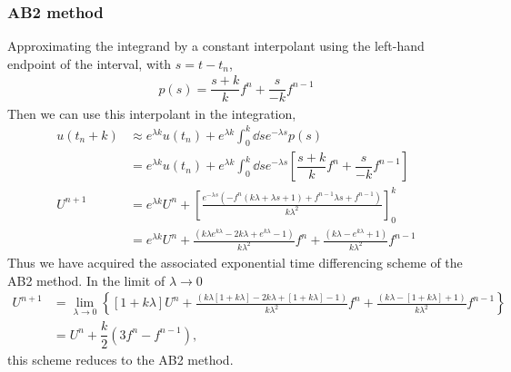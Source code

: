 \documentclass[12pt]{article}
\begin{document}
\subsubsection*{AB2 method}

Approximating the integrand by a constant interpolant using the left-hand endpoint of the interval, with $s=t-t_{n}$,
\begin{align}
p(s) = \dfrac{s+k}{k}f^{n} + \dfrac{s}{-k}f^{n-1}
\end{align} 
Then we can use this interpolant in the integration,
\begin{subequations}
    \begin{align}
    u(t_{n}+k) &\approx e^{\lambda k} u(t_{n}) + e^{\lambda k}\int_{0}^{k}\dd{s} e^{-\lambda s}p(s)\\
    &= e^{\lambda k} u(t_{n}) + e^{\lambda k}\int_{0}^{k}\dd{s} e^{-\lambda s}\left[\dfrac{s+k}{k}f^{n} + \dfrac{s}{-k}f^{n-1}\right]\\
    U^{n+1} &= e^{\lambda k} U^{n} + \left[\frac{e^{-\lambda s}(-f^{n}(k\lambda+\lambda s+1)+f^{n-1}\lambda s+f^{n-1})}{k\lambda^2}\right]_{0}^{k}\\
    &= e^{\lambda k} U^{n} + \frac{\left(k\lambda e^{k\lambda}-2k\lambda+e^{k\lambda}-1\right)}{k\lambda^2}f^{n} +\frac{\left(k\lambda-e^{k\lambda}+1\right)}{k\lambda^2}f^{n-1} 
    \end{align}
\end{subequations}
Thus we have acquired the associated exponential time differencing scheme of the AB2 method. In the limit of $\lambda\to 0$ 
\begin{subequations}
    \begin{align}
        U^{n+1} &= \lim\limits_{\lambda\to 0}\left\{\left[1+k\lambda\right]U^{n} + \frac{\left(k\lambda \left[1+k\lambda\right]-2k\lambda+\left[1+k\lambda\right]-1\right)}{k\lambda^2}f^{n} +\frac{\left(k\lambda-\left[1+k\lambda\right]+1\right)}{k\lambda^2}f^{n-1}\right\} \\
        &= U^{n} + \dfrac{k}{2}(3f^{n}-f^{n-1}),
    \end{align}
\end{subequations}
this scheme reduces to the AB2 method.
\end{document}
